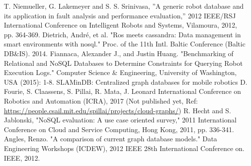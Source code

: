 \begin{thebibliography}{9}
T. Niemueller, G. Lakemeyer and S. S. Srinivasa, ”A generic robot database and its application in fault analysis and performance evaluation,” 2012 IEEE/RSJ International Conference on Intelligent Robots and Systems, Vilamoura, 2012, pp. 364-369.
Dietrich, André, et al. "Ros meets cassandra: Data management in smart environments with nosql." Proc. of the 11th Intl. Baltic Conference (Baltic DB\&IS). 2014.
Fiannaca, Alexander J., and Justin Huang. "Benchmarking of Relational and NoSQL Databases to Determine Constraints for Querying Robot Execution Logs." Computer Science \& Engineering, University of Washington, USA (2015): 1-8.
SLAMinDB: Centralized graph databases for mobile robotics
D. Fourie, S. Claassens, S. Pillai, R. Mata, J. Leonard
International Conference on Robotics and Automation (ICRA), 2017 (Not published yet, Ref: \href{https://people.csail.mit.edu/spillai/projects/cloud-graphs/}{https://people.csail.mit.edu/spillai/projects/cloud-graphs/})
R. Hecht and S. Jablonski, "NoSQL evaluation: A use case oriented survey," 2011 International Conference on Cloud and Service Computing, Hong Kong, 2011, pp. 336-341.
Angles, Renzo. "A comparison of current graph database models." Data Engineering Workshops (ICDEW), 2012 IEEE 28th International Conference on. IEEE, 2012.
\end{thebibliography}